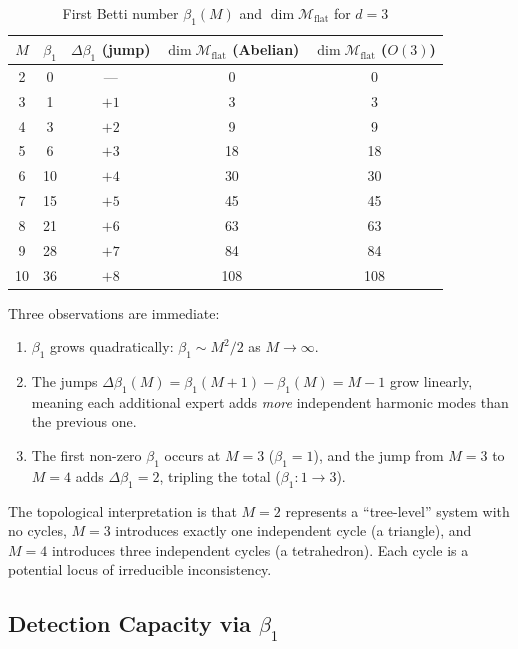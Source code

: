 \documentclass[12pt,a4paper]{article}
\theoremstyle{definition}
\theoremstyle{remark}
\theoremstyle{definition}
\begin{document}
\begin{table}[H]
  \centering
  \caption{First Betti number $\beta_1(M)$ and $\dim\mathcal{M}_{\text{flat}}$ for $d=3$}
  \label{tab:beta_sequence}
  \begin{tabular}{@{}c c c c c@{}}
    \toprule
    $M$ & $\beta_1$ & $\Delta\beta_1$ (jump) & $\dim\mathcal{M}_{\text{flat}}$ (Abelian) & $\dim\mathcal{M}_{\text{flat}}$ ($O(3)$) \\
    \midrule
    2 & 0  & --- & 0  & 0 \\
    3 & 1  & $+1$ & 3  & 3 \\
    4 & 3  & $+2$ & 9  & 9 \\
    5 & 6  & $+3$ & 18 & 18 \\
    6 & 10 & $+4$ & 30 & 30 \\
    7 & 15 & $+5$ & 45 & 45 \\
    8 & 21 & $+6$ & 63 & 63 \\
    9 & 28 & $+7$ & 84 & 84 \\
    10& 36 & $+8$ & 108& 108 \\
    \bottomrule
  \end{tabular}
\end{table}

Three observations are immediate:
\begin{enumerate}[nosep]
  \item $\beta_1$ grows quadratically: $\beta_1 \sim M^2/2$ as $M \to \infty$.
  \item The jumps $\Delta\beta_1(M) = \beta_1(M+1) - \beta_1(M) = M-1$ grow linearly, meaning each additional expert adds \emph{more} independent harmonic modes than the previous one.
  \item The first non-zero $\beta_1$ occurs at $M=3$ ($\beta_1=1$), and the jump from $M=3$ to $M=4$ adds $\Delta\beta_1 = 2$, tripling the total ($\beta_1: 1 \to 3$).
\end{enumerate}

The topological interpretation is that $M=2$ represents a ``tree-level'' system with no cycles, $M=3$ introduces exactly one independent cycle (a triangle), and $M=4$ introduces three independent cycles (a tetrahedron). Each cycle is a potential locus of irreducible inconsistency.

\subsection{Detection Capacity via $\beta_1$}
\end{document}
